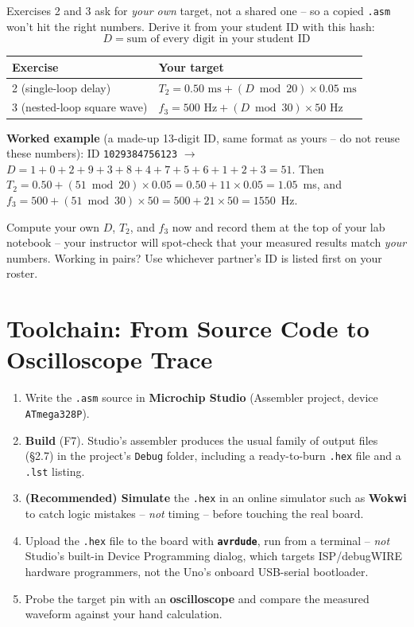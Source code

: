 \documentclass[11pt]{article}
\begin{document}
\begin{summary}
Exercises 2 and 3 ask for \emph{your own} target, not a shared one -- so a copied
\texttt{.asm} won't hit the right numbers. Derive it from your student ID with this
hash:
\[
D = \text{sum of every digit in your student ID}
\]
\begin{center}
\begin{tabular}{@{}p{5.7cm}p{8.9cm}@{}}
\toprule
\textbf{Exercise} & \textbf{Your target} \\
\midrule
2 (single-loop delay) & $T_2 = 0.50\text{ ms} + (D \bmod 20) \times 0.05\text{ ms}$ \\
3 (nested-loop square wave) & $f_3 = 500\text{ Hz} + (D \bmod 30) \times 50\text{ Hz}$ \\
\bottomrule
\end{tabular}
\end{center}
\textbf{Worked example} (a made-up 13-digit ID, same format as yours -- do not reuse
these numbers): ID \texttt{1029384756123} $\to$
$D = 1{+}0{+}2{+}9{+}3{+}8{+}4{+}7{+}5{+}6{+}1{+}2{+}3 = 51$. Then
$T_2 = 0.50 + (51 \bmod 20)\times0.05 = 0.50 + 11\times0.05 = 1.05$~ms, and
$f_3 = 500 + (51 \bmod 30)\times50 = 500 + 21\times50 = 1550$~Hz.

Compute your own $D$, $T_2$, and $f_3$ now and record them at the top of your lab
notebook -- your instructor will spot-check that your measured results match
\emph{your} numbers. Working in pairs? Use whichever partner's ID is listed first on
your roster.
\end{summary}

\section*{Toolchain: From Source Code to Oscilloscope Trace}

\begin{enumerate}[leftmargin=*,nosep]
  \item Write the \texttt{.asm} source in \textbf{Microchip Studio} (Assembler
        project, device \texttt{ATmega328P}).
  \item \textbf{Build} (F7). Studio's assembler produces the usual family of
        output files (\S2.7) in the project's \texttt{Debug} folder, including a
        ready-to-burn \texttt{.hex} file and a \texttt{.lst} listing.
  \item \textbf{(Recommended) Simulate} the \texttt{.hex} in an online simulator
        such as \textbf{Wokwi} to catch logic mistakes -- \emph{not} timing --
        before touching the real board.
  \item Upload the \texttt{.hex} file to the board with \textbf{\texttt{avrdude}},
        run from a terminal -- \emph{not} Studio's built-in Device Programming
        dialog, which targets ISP/debugWIRE hardware programmers, not the Uno's
        onboard USB-serial bootloader.
  \item Probe the target pin with an \textbf{oscilloscope} and compare the measured
        waveform against your hand calculation.
\end{enumerate}
\end{document}
